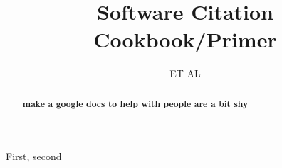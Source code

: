 \documentclass[twocolumn]{openjournal}
\newcommand{\UCSD}{Department of Astronomy and Astrophysics, University of California, San Diego, La Jolla, CA 92093, USA}
\begin{document}
\title{Software Citation Cookbook/Primer }




\author{ET AL  }



\begin{abstract}
\textbf{make a google docs to help with people are a bit shy }
\end{abstract}

\begin{keywords}
    {First, second}
\end{keywords}


\maketitle











\end{document}
